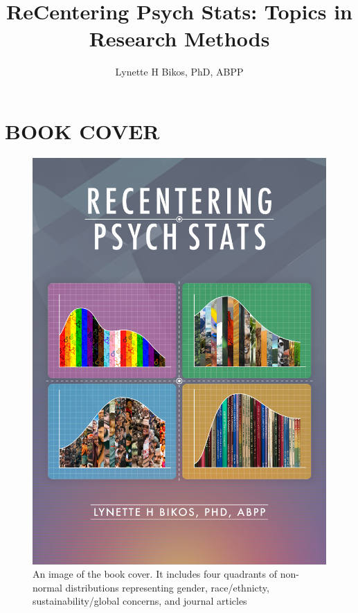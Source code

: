 \documentclass[
  english,
]{book}
\title{ReCentering Psych Stats: Topics in Research Methods}
\author{Lynette H Bikos, PhD, ABPP}
\date{}
\begin{document}
\maketitle

{
\setcounter{tocdepth}{1}
\tableofcontents
}
\hypertarget{book-cover}{%
\chapter*{BOOK COVER}\label{book-cover}}

\begin{figure}
\centering
\includegraphics{images/ReCenterPsychStats_bookcover.png}
\caption{An image of the book cover. It includes four quadrants of non-normal distributions representing gender, race/ethnicty, sustainability/global concerns, and journal articles}
\end{figure}
\end{document}
